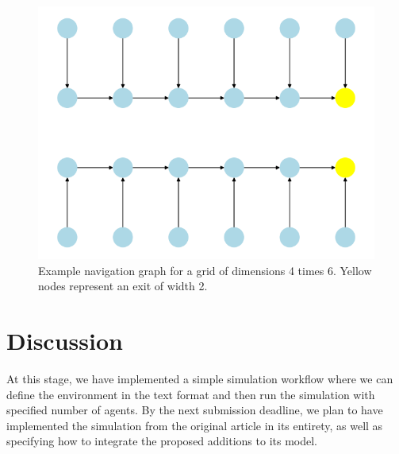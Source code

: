 \documentclass[9pt]{pnas-new}
\begin{document}
\begin{figure}[h!]
    \centering
    \includegraphics[width=0.5\linewidth]{fig/spgraph.png}
    \caption{Example navigation graph for a grid of dimensions 4 times 6. Yellow nodes represent an exit of width 2.}
    \label{fig:spgraph}
\end{figure}

\section{Discussion}
At this stage, we have implemented a simple simulation workflow where we can define the environment in the text format and then run the simulation with specified number of agents. By the next submission deadline, we plan to have implemented the simulation from the original article in its entirety, as well as specifying how to integrate the proposed additions to its model.


\end{document}
